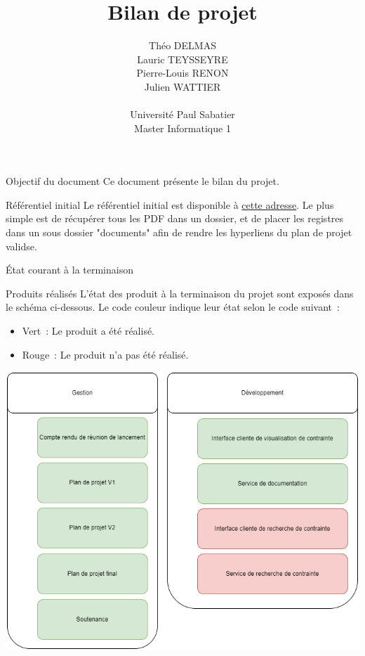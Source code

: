 \documentclass[]{article}
\title{Bilan de projet}
\author{
    Théo DELMAS\\
    Lauric TEYSSEYRE\\
    Pierre-Louis RENON\\
    Julien WATTIER\\
    \\
    Université Paul Sabatier\\
    Master Informatique 1\\
   }
\begin{document}
\maketitle
\newpage
\tableofcontents
\newpage

\begin{section}{Objectif du document}
 Ce document présente le bilan du projet.
\end{section}

{
\setlength{\parindent}{0pt} %
\begin{section}{Référentiel initial}
    Le référentiel initial est disponible à \href{https://github.com/Szyckaa/UE-PROJET-DOCS-GESTION/releases/tag/2.0.0}{cette adresse}.
    Le plus simple est de récupérer tous les PDF dans un dossier, et de placer les registres dans un sous dossier "documents" afin de rendre les hyperliens du plan de projet validse.
\end{section}

\begin{section}{État courant à la terminaison}
 \begin{subsection}{Produits réalisés}
     L’état des produit à la terminaison du projet sont exposés dans le schéma ci-dessous. Le code couleur indique leur état selon le code suivant :

     \begin{itemize}
         \item Vert : Le produit a été réalisé.
         \item Rouge : Le produit n’a pas été réalisé.
     \end{itemize}

     \includegraphics[scale=0.49]{IMG/PBS_final}


\end{subsection}
\end{section}}
\end{document}
